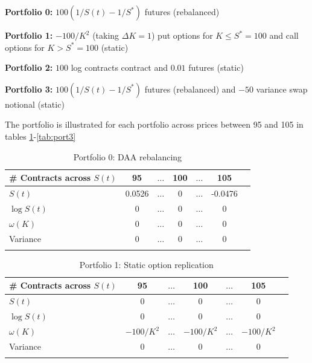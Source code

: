 \documentclass[12pt]{article}
\begin{document}
\textbf{Portfolio 0:}   $100(1/S(t) - 1/S^*)$ futures (rebalanced)

\textbf{Portfolio 1:}  $-100/K^2$  (taking $\Delta K = 1$) put options for $K\leq S^* = 100$ and call options for $K>S^* = 100$ (static)

\textbf{Portfolio 2:}   $100$ log contracts contract and $0.01$ futures (static)

\textbf{Portfolio 3:}   $100 (1/S(t) - 1/S^*)$ futures (rebalanced) and $-50$ variance swap notional  (static)

The portfolio is illustrated for each portfolio across prices between 95 and 105 in tables \ref{tab:port0}-\ref{tab:port3}


   \begin{table}[!ht]
     \caption{Portfolio 0: DAA rebalancing}\label{tab:port0}
     \centering
     \begin{tabularx}{\linewidth}{Xcccccc}\toprule
        \# Contracts across $S(t)$ & 95  & $\ldots$ & 100 & $\ldots$ & 105\\ \midrule
       $S(t)$ & 0.0526 & $\ldots$ & 0& $\ldots$ &  -0.0476   \\
       $\log S(t)$& 0  & $\ldots$ & 0& $\ldots$ &  0   \\
       $\omega(K)$ & 0 & $\ldots$ & 0& $\ldots$ &  0   \\
       Variance &  0 & $\ldots$ & 0& $\ldots$ &  0   \\
       \addlinespace
     \end{tabularx}

   \end{table}

   \begin{table}[!ht]
     \caption{Portfolio 1: Static option replication}\label{tab:port1}
     \centering
     \begin{tabularx}{\linewidth}{Xcccccc}\toprule
         \# Contracts across $S(t)$& 95  & $\ldots$ & 100 & $\ldots$ & 105\\ \midrule
       
       $S(t)$ & 0 & $\ldots$ & 0& $\ldots$ &  0   \\
       $\log S(t)$& 0 & $\ldots$ & 0& $\ldots$ &  0   \\
       $\omega(K)$ & $-100/K^2$ & $\ldots$ & $-100/K^2$& $\ldots$ &  $-100/K^2$    \\
       Variance &  0 & $\ldots$ & 0& $\ldots$ &  0   \\
       \addlinespace
     \end{tabularx}

   \end{table}
   
\end{document}
